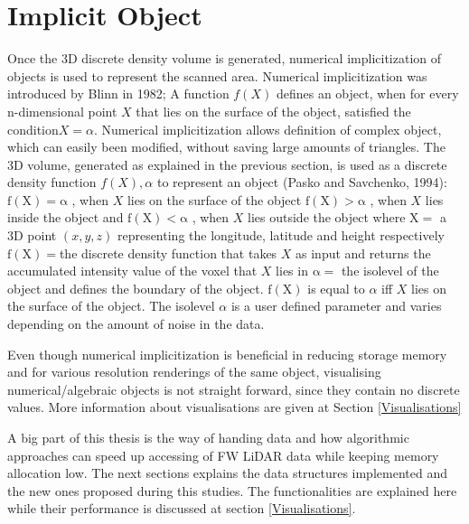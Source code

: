 \documentclass{subfiles}
\begin{document}
\section{Implicit Object}
Once the 3D discrete density volume is generated, numerical implicitization of objects is used to represent the scanned area. Numerical implicitization was introduced by Blinn in 1982; A function $ \mathit{f(X)} $ defines an object, when for every n-dimensional point $ \mathit{X} $  that lies on the surface of the object, satisfied the condition$ \mathit{X=\alpha }  $. Numerical implicitization allows definition of complex object, which can easily been modified, without saving large amounts of triangles. \newline
The 3D volume, generated as explained in the previous section, is used as a discrete density function $\mathit{f(X), \alpha }$ to represent an object (Pasko and Savchenko, 1994): \newline
$	\mathrm{f(X) = \alpha }$ , when $X$ lies on the surface of the object\newline
$	\mathrm{f(X) > \alpha }$ , when $X$ lies inside the object and\newline
$	\mathrm{f(X) < \alpha }$ , when $X$ lies outside the object	 \newline
where	\newline 
$	\mathrm{X 	=}$  a 3D point $\mathit{(x, y, z) }$ representing the longitude, latitude and height respectively  \newline
$	\mathrm{f(X) 	= }$the discrete density function that takes  $\mathit{X}$ as input and returns the accumulated intensity value of the voxel that  $\mathit{X}$ lies in \newline
$	\mathrm{	\alpha 	= }$ the isolevel of the object and defines the boundary of the object. \newline
$	\mathrm{	f(X)}$ is equal to $\mathit{\alpha }$ iff  $\mathit{X}$ lies on the surface of the object. The isolevel $\mathit{\alpha }$ is a user defined parameter and varies depending on the amount of noise in the data.  \newline

Even though numerical implicitization is beneficial in reducing storage memory and for various resolution renderings of the same object, visualising numerical/algebraic objects is not straight forward, since they contain no discrete values. More information about visualisations are given at Section \ref{Visualisations}

A big part of this thesis is the way of handing data and how algorithmic approaches can speed up accessing of FW LiDAR data while keeping memory allocation low. The next sections explains the data structures implemented and the new ones proposed during this studies. The functionalities are explained here while their performance is discussed at section \ref{Visualisations}. 
\end{document}
